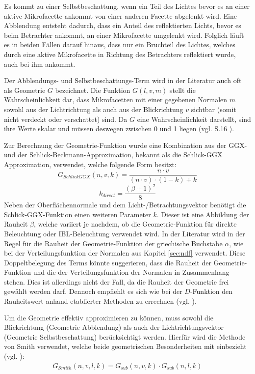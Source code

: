 \documentclass[
  11pt,
  a4paper,
  oneside
  ]{article}
\begin{document}
Es kommt zu einer Selbstbeschattung, wenn ein Teil des Lichtes bevor es an einer aktive Mikrofacette ankommt von einer anderen Facette abgelenkt wird. Eine Abblendung entsteht dadurch, dass ein Anteil des reflektierten Lichts, bevor es beim Betrachter ankommt, an einer Mikrofacette umgelenkt wird. Folglich läuft es in beiden Fällen darauf hinaus, dass nur ein Bruchteil des Lichtes, welches durch eine aktive Mikrofacette in Richtung des Betrachters reflektiert wurde, auch bei ihm ankommt. 

Der Abblendungs- und Selbstbeschattungs-Term wird in der Literatur auch oft als Geometrie $G$ bezeichnet. Die Funktion $G(l, v, m)$ stellt die Wahrscheinlichkeit dar, dass Mikrofacetten mit einer gegebenen Normalen $m$ sowohl aus der Lichtrichtung als auch aus der Blickrichtung $v$ sichtbar (somit nicht verdeckt oder verschattet) sind. Da $G$ eine Wahrscheinlichkeit darstellt, sind ihre Werte skalar und müssen deswegen zwischen 0 und 1 liegen (vgl. S.16 \cite{rtrPaper}). 

Zur Berechnung der Geometrie-Funktion wurde eine Kombination aus der GGX- und der Schlick-Beckmann-Approximation, bekannt als die Schlick-GGX Approximation, verwendet, welche folgende Form besitzt: 
\begin{equation}
  G_{SchlickGGX}\left( n,v,k\right) =\dfrac{n\cdot v}{\left( n\cdot v\right) \cdot \left( 1-k\right) +k} %
\end{equation}
\begin{equation}
  k_{direct}=\dfrac{\left( \beta +1\right) ^{2}}{8} %
\end{equation}
Neben der Oberflächennormale und dem Licht-/Betrachtungsvektor benötigt die Schlick-GGX-Funktion einen weiteren Parameter $k$. Dieser ist eine Abbildung der Rauheit $\beta$, welche variiert je nachdem, ob die Geometrie-Funktion für direkte Beleuchtung oder IBL-Beleuchtung verwendet wird. In der Literatur wird in der Regel für die Rauheit der Geometrie-Funktion der griechische Buchstabe $\alpha$, wie bei der Verteilungsfunktion der Normalen aus Kapitel 
\ref{sec:ndf} verwendet. Diese Doppeltbelegung des Terms könnte suggerieren, dass die Rauheit der Geometrie-Funktion und die der Verteilungsfunktion der Normalen in Zusammenhang stehen. Dies ist allerdings nicht der Fall, da die Rauheit der Geometrie frei gewählt werden darf. Dennoch empfiehlt es sich wie bei der $D$-Funktion den Rauheitswert anhand etablierter Methoden zu errechnen (vgl. \cite{learnOpenGL}).

Um die Geometrie effektiv approximieren zu können, muss sowohl die Blickrichtung (Geometrie Abblendung) als auch der Lichtrichtungsvektor (Geometrie Selbstbeschattung) berücksichtigt werden. Hierfür wird die Methode von Smith verwendet, welche beide geometrischen Besonderheiten mit einbezieht (vgl. \cite{learnOpenGL}): 
\begin{eqnarray}
  G_{Smith}\left( n,v,l,k\right) =G_{sub}\left( n,v,k\right) \cdot G_{sub}\left( n,l,k\right)
\end{eqnarray}
\end{document}
